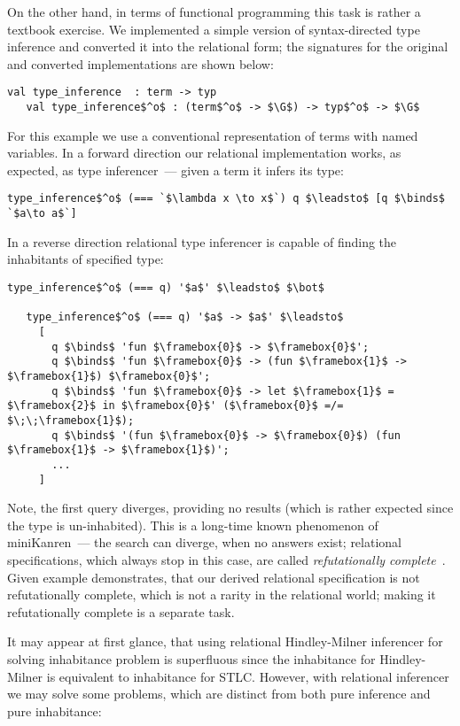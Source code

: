 On the other hand, in terms of functional programming this task is rather a textbook exercise. We implemented a simple version of
syntax-directed type inference and converted it into the relational form; the signatures for the original and converted
implementations are shown below:

\begin{lstlisting}[basicstyle=\small]
   val type_inference  : term -> typ
   val type_inference$^o$ : (term$^o$ -> $\G$) -> typ$^o$ -> $\G$
\end{lstlisting}

For this example we use a conventional representation of terms with named variables. In a forward direction our relational implementation works, 
as expected, as type inferencer~--- given a term it infers its type:

\begin{lstlisting}[basicstyle=\small]
   type_inference$^o$ (=== `$\lambda x \to x$`) q $\leadsto$ [q $\binds$ `$a\to a$`]
\end{lstlisting}

In a reverse direction relational type inferencer is capable of finding the inhabitants of specified type:

\begin{lstlisting}[basicstyle=\small]
   type_inference$^o$ (=== q) '$a$' $\leadsto$ $\bot$

   type_inference$^o$ (=== q) '$a$ -> $a$' $\leadsto$ 
     [
       q $\binds$ 'fun $\framebox{0}$ -> $\framebox{0}$'; 
       q $\binds$ 'fun $\framebox{0}$ -> (fun $\framebox{1}$ -> $\framebox{1}$) $\framebox{0}$'; 
       q $\binds$ 'fun $\framebox{0}$ -> let $\framebox{1}$ = $\framebox{2}$ in $\framebox{0}$' ($\framebox{0}$ =/= $\;\;\framebox{1}$);
       q $\binds$ '(fun $\framebox{0}$ -> $\framebox{0}$) (fun $\framebox{1}$ -> $\framebox{1}$)';
       ...
     ]
\end{lstlisting}

Note, the first query diverges, providing no results (which is rather expected since the type is un-inhabited). This is a long-time known phenomenon of
miniKanren~--- the search can diverge, when no answers exist; relational specifications, which always stop in this case, are called
\emph{refutationally complete}~\cite{WillThesis}. Given example demonstrates, that our derived relational specification is not refutationally
complete, which is not a rarity in the relational world; making it refutationally complete is a separate task.

It may appear at first glance, that using relational Hindley-Milner inferencer for solving inhabitance problem is superfluous since the inhabitance for
Hindley-Milner is equivalent to inhabitance for STLC. However, with relational inferencer we may solve some problems, which are distinct from
both pure inference and pure inhabitance:

